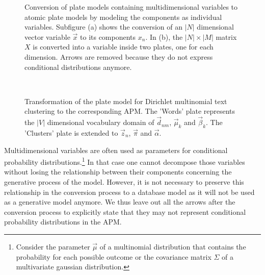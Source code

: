 \begin{figure}[p]
\centering
\scalebox{\tikzScale}{\adjustTikzSize }
\caption{Conversion of plate models containing multidimensional variables to atomic plate models by modeling the components as individual variables. Subfigure (a) shows the conversion of an $|N|$ dimensional vector variable $\vec x$ to its components $x_n$. In (b), the $|N| \times |M|$ matrix $X$ is converted into a variable inside two plates, one for each dimension. Arrows are removed because they do not express conditional distributions anymore.}\label{fig:pm2apm}
\end{figure}

\begin{figure}[p]
\begin{minipage}[t]{0.49\linewidth}
	\begin{center}
	\end{center}
\end{minipage}
\hspace{0.0cm}
\begin{minipage}[t]{0.49\linewidth}
	\begin{center}
	\end{center}
\end{minipage}\\
\caption{Transformation of the plate model for Dirichlet multinomial text clustering to the corresponding APM. The 'Words' plate represents the $|V|$ dimensional vocabulary domain of $\vec d_{nm}$, $\vec \mu_k$ and $\vec \beta_k$. The 'Clusters' plate is extended to $\vec z_n$, $\vec \pi$ and $\vec \alpha$.}
\label{fig:clustering_platemodels}
\end{figure}

Multidimensional variables are often used as parameters for conditional probability distributions.\footnote{Consider the parameter $\vec \mu$ of a multinomial distribution that contains the probability for each possible outcome or the covariance matrix $\Sigma$ of a multivariate gaussian distribution.} In that case one cannot decompose those variables without losing the relationship between their components concerning the generative process of the model. However, it is not necessary to preserve this relationship in the conversion process to a database model as it will not be used as a generative model anymore. We thus leave out all the arrows after the conversion process to explicitly state that they may not represent conditional probability distributions in the APM.

